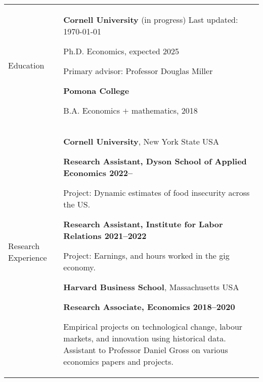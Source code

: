 \documentclass[letterpaper,11pt,oneside]{article}
\begin{document}
\noindent
\begin{tabular}[\textwidth]{p{} p{}}
    \Large{Education}
    & \textbf{Cornell University} (in progress)  \hfill Last updated: \today

    Ph.D. Economics, expected 2025 
    
    Primary advisor: Professor Douglas Miller \vspace{0.1cm}
    
    \textbf{Pomona College}

    B.A. Economics $+$ mathematics, 2018 \vspace{0.2cm} \\
    
    
    
\Large{Research Experience}
    & \textbf{Cornell University}, New York State USA
    
    \textbf{Research Assistant, Dyson School of Applied Economics 2022--}

    Project: Dynamic estimates of food insecurity across the US.
    
    \textbf{Research Assistant, Institute for Labor Relations 2021--2022}

    Project: Earnings, and hours worked in the gig economy.
    \vspace{0.2cm}
    

    \textbf{Harvard Business School}, Massachusetts USA
    
    \textbf{Research Associate, Economics 2018--2020}
    
    Empirical projects on technological change, labour markets, and innovation using historical data.
    Assistant to Professor Daniel Gross on various economics papers and projects.
    \vspace{0.2cm} \\


\end{tabular}
\end{document}
